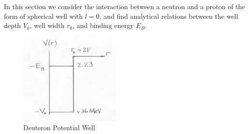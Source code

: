 \documentclass{school-22.101-notes}
\date{October 19, 2011}
\begin{document}
\maketitle


In this section we consider the interaction between a neutron and a proton of the form of spherical well with $l=0$, and find analytical relations between the well depth $V_0$, well width $r_0$, and binding energy $E_B$.  

\begin{figure}[h!]
    \centering
    \includegraphics[width=2in]{images/deuteron/deuteron-potential.png}
    \caption{Deuteron Potential Well}
\end{figure}
\end{document}
